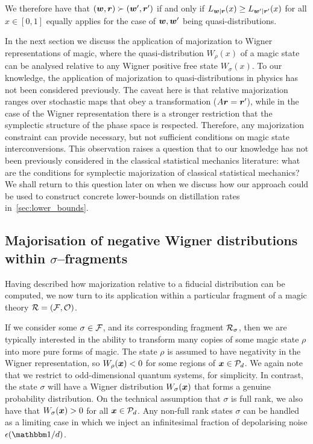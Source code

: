 \documentclass[pra,
aps,
twocolumn,
superscriptaddress,
groupedaddress,
nofootinbib,
reprint
]{revtex4-1}
\begin{document}
We therefore have that $(\boldsymbol{w}, \boldsymbol{r}) \succ (\boldsymbol{w}', \boldsymbol{r}')$ if and only if $L_{\boldsymbol{w} | \boldsymbol{r}} (x) \ge L_{\boldsymbol{w}' | \boldsymbol{r}'}(x)$ for all $x \in [0,1]$ equally applies for the case of $\boldsymbol{w},\boldsymbol{w}'$ being quasi-distributions. 

In the next section we discuss the application of majorization to Wigner representations of magic, where the quasi-distribution $W_\rho(x)$ of a magic state can be analysed relative to any Wigner positive free state $W_\sigma(x)$. To our knowledge, the application of majorization to quasi-distributions in  physics has not been considered previously. The caveat here is that relative majorization ranges over stochastic maps that obey a transformation ($A\boldsymbol{r} = \boldsymbol{r}'$), while in the case of the Wigner representation there is a stronger restriction that the symplectic structure of the phase space is respected. Therefore, any majorization constraint can provide necessary, but not sufficient conditions on magic state interconversions. This observation raises a question that to our knowledge has not been previously considered in the classical statistical mechanics literature: what are the conditions for symplectic majorization of classical statistical mechanics? We shall return to this question later on when we discuss how our approach could be used to construct concrete lower-bounds on distillation rates in~\cref{sec:lower_bounds}.

\subsection{Majorisation of negative Wigner distributions within $\sigma$--fragments}
\label{sec:major_frag}

Having described how majorization relative to a fiducial distribution can be computed, we now turn to its application within a particular fragment of a magic theory $\mathcal{R}= (\mathcal{F}, \mathcal{O})$.

If we consider some $\sigma \in \mathcal{F}$, and its corresponding fragment $\mathcal{R}_\sigma$, then we are typically interested in the ability to transform many copies of some magic state $\rho$ into more pure forms of magic. The state $\rho$ is assumed to have negativity in the Wigner representation, so $W_\rho(\boldsymbol{x}) < 0$ for some regions of $\boldsymbol{x} \in {\mathcal P}_d$. We again note that we restrict to odd-dimensional quantum systems, for simplicity. In contrast, the state $\sigma$ will have a Wigner distribution $W_\sigma(\boldsymbol{x})$ that forms a genuine probability distribution. On the technical assumption that $\sigma$ is full rank, we also have that $W_\sigma(\boldsymbol{x}) > 0$ for all $\boldsymbol{x} \in {\mathcal P}_d$. Any non-full rank states $\sigma$ can be handled as a limiting case in which we inject an infinitesimal fraction of depolarising noise $\epsilon (\id/d)$.
\end{document}
